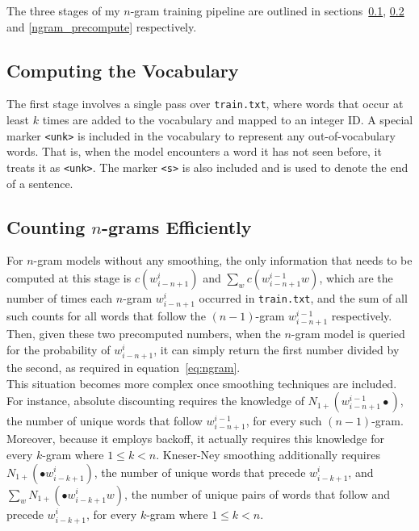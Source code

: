 \documentclass[a4paper, 12pt]{report}
\newcommand{\ttt}[1]{\texttt{#1}}
\begin{document}
The three stages of my $n$-gram training pipeline are outlined in sections~\ref{ngram_compute_vocab}, \ref{ngram_count} and \ref{ngram_precompute} respectively.

\subsection{Computing the Vocabulary} \label{ngram_compute_vocab}

The first stage involves a single pass over \ttt{train.txt}, where words that occur at least $k$ times are added to the vocabulary and mapped to an integer ID. A special marker \ttt{<unk>} is included in the vocabulary to represent any out-of-vocabulary words. That is, when the model encounters a word it has not seen before, it treats it as \ttt{<unk>}. The marker \ttt{<s>} is also included and is used to denote the end of a sentence.

\subsection{Counting $n$-grams Efficiently} \label{ngram_count}

For $n$-gram models without any smoothing, the only information that needs to be computed at this stage is $c(w_{i - n + 1}^{i})$ and $\sum_w c(w_{i - n + 1}^{i - 1}w)$, which are the number of times each $n$-gram $w_{i - n + 1}^i$ occurred in \ttt{train.txt}, and the sum of all such counts for all words that follow the $(n-1)$-gram $w_{i - n + 1}^{i - 1}$ respectively. Then, given these two precomputed numbers, when the $n$-gram model is queried for the probability of $w_{i - n + 1}^i$, it can simply return the first number divided by the second, as required in equation~\ref{eq:ngram}. \\

This situation becomes more complex once smoothing techniques are included. For instance, absolute discounting requires the knowledge of $N_{1+}(w_{i - n + 1}^{i - 1}\bullet)$, the number of unique words that follow $w_{i - n + 1}^{i - 1}$, for every such $(n - 1)$-gram. Moreover, because it employs backoff, it actually requires this knowledge for every $k$-gram where $1 \leq k < n$. Kneser-Ney smoothing additionally requires $N_{1+}(\bullet w_{i - k + 1}^i)$, the number of unique words that precede $w_{i - k + 1}^i$, and $\sum_w N_{1+}(\bullet w_{i - k + 1}^iw)$, the number of unique pairs of words that follow and precede $w_{i - k + 1}^i$, for every $k$-gram where $1 \leq k < n$. \\
\end{document}
